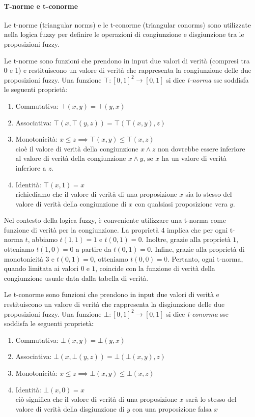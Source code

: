 \paragraph{T-norme e t-conorme}
Le t-norme (triangular norms) e le t-conorme (triangular conorms) sono utilizzate nella logica fuzzy per definire le operazioni di congiunzione e disgiunzione tra le proposizioni fuzzy.

Le t-norme sono funzioni che prendono in input due valori di verità (compresi tra 0 e 1) e restituiscono un valore di verità che rappresenta la congiunzione delle due proposizioni fuzzy. Una funzione $\top : [0,1]^2 \to [0,1]$ si dice \textit{t-norma} sse soddisfa le seguenti proprietà:
\begin{enumerate}
    \item Commutativa: {$\top(x,y) = \top(y,x)$}
    \item Associativa: {$\top(x,\top(y,z)) = \top(\top(x,y),z)$}
    \item Monotonicità: {$x \leq z \implies \top(x,y) \leq \top(x,z)$}\\
    cioè il valore di verità della congiunzione $x \land z$ non dovrebbe essere inferiore al valore di verità della congiunzione $x \land y$, se $x$ ha un valore di verità inferiore a $z$.
    \item Identità: {$\top(x,1) = x$}\\
    richiediamo che il valore di verità di una proposizione $x$ sia lo stesso del valore di verità della congiunzione di $x$ con qualsiasi proposizione vera $y$.
\end{enumerate}
Nel contesto della logica fuzzy, è conveniente utilizzare una t-norma come funzione di verità per la congiunzione. La proprietà $4$ implica che per ogni t-norma $t$, abbiamo $t(1, 1) = 1$ e $t(0, 1) = 0$. Inoltre, grazie alla proprietà $1$, otteniamo $t(1, 0) = 0$ a partire da $t(0, 1) = 0$. Infine, grazie alla proprietà di monotonicità $3$ e $t(0, 1) = 0$, otteniamo $t(0, 0) = 0$. Pertanto, ogni t-norma, quando limitata ai valori $0$ e $1$, coincide con la funzione di verità della congiunzione usuale data dalla tabella di verità.

Le t-conorme sono funzioni che prendono in input due valori di verità e restituiscono un valore di verità che rappresenta la disgiunzione delle due proposizioni fuzzy. Una funzione $\bot: [0,1]^2 \to [0,1]$ si dice \textit{t-conorma} sse soddisfa le seguenti proprietà:
\begin{enumerate}
    \item Commutativa: {$\bot(x,y) = \bot(y,x)$}
    \item Associativa: {$\bot(x,\bot(y,z)) = \bot(\bot(x,y),z)$}
    \item Monotonicità: {$x \leq z \implies \bot(x,y) \leq \bot(x,z)$}
    \item Identità: {$\bot(x,0) = x$}\\
    ciò significa che il valore di verità di una proposizione $x$ sarà lo stesso del valore di verità della disgiunzione di $y$ con una proposizione falsa $x$
\end{enumerate}

